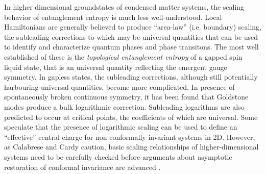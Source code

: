\documentclass[prl,aps,twocolumn,floatfix,amsmath,amssymb,superscriptaddress,tightenlines]{revtex4}
\begin{document}
In higher dimensional groundstates of condensed matter systems, the scaling behavior of
entanglement entropy is much less well-understood.  Local Hamiltonians
are generally believed to produce ``area-law'' (i.e. boundary) scaling, the subleading corrections
to which may be universal quantities that can be used to identify and characterize
quantum phases and phase transitons.
The most well established of these is the {\it topological entanglement entropy} of a gapped
spin liquid state, that is an universal quantity reflecting the emergent gauge symmetry.
In gapless states, the subleading corrections, although still potentially harbouring universal 
quantities, become more complicated.
In presence of spontaneously broken continuous symmetry, it has been found that Goldstone modes 
produce a bulk logarithmic correction.
Subleading logarithms are also predicted to occur at critical points, the coefficients of which are universal. 
Some speculate that the presence of logarithmic scaling can be used to define an ``effective'' central
charge for non-conformally invariant systems in 2D. %
However, as Calabrese and Cardy caution, basic scaling relationships of
higher-dimensional systems need to be carefully checked before
arguments about asymptotic restoration of conformal invariance are
advanced \cite{EE_CFT}.
\end{document}

